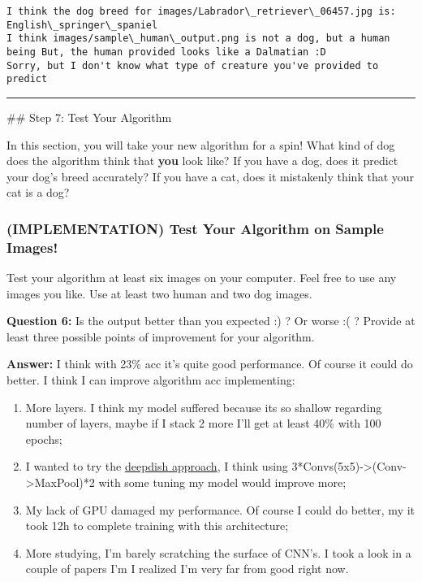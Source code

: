 \documentclass[11pt]{article}
\providecommand{\tightlist}{%
      \setlength{\itemsep}{0pt}\setlength{\parskip}{0pt}}
\begin{document}
    \begin{Verbatim}[commandchars=\\\{\}]
I think the dog breed for images/Labrador\_retriever\_06457.jpg is: English\_springer\_spaniel
I think images/sample\_human\_output.png is not a dog, but a human being But, the human provided looks like a Dalmatian :D
Sorry, but I don't know what type of creature you've provided to predict

    \end{Verbatim}

    \begin{center}\rule{0.5\linewidth}{\linethickness}\end{center}

 \#\# Step 7: Test Your Algorithm

In this section, you will take your new algorithm for a spin! What kind
of dog does the algorithm think that \textbf{you} look like? If you have
a dog, does it predict your dog's breed accurately? If you have a cat,
does it mistakenly think that your cat is a dog?

\hypertarget{implementation-test-your-algorithm-on-sample-images}{%
\subsubsection{(IMPLEMENTATION) Test Your Algorithm on Sample
Images!}\label{implementation-test-your-algorithm-on-sample-images}}

Test your algorithm at least six images on your computer. Feel free to
use any images you like. Use at least two human and two dog images.

\textbf{Question 6:} Is the output better than you expected :) ? Or
worse :( ? Provide at least three possible points of improvement for
your algorithm.

\textbf{Answer:} I think with 23\% acc it's quite good performance. Of
course it could do better. I think I can improve algorithm acc
implementing:

\begin{enumerate}
\def\labelenumi{\arabic{enumi}.}
\tightlist
\item
  More layers. I think my model suffered because its so shallow
  regarding number of layers, maybe if I stack 2 more I'll get at least
  40\% with 100 epochs;
\item
  I wanted to try the
  \href{https://github.com/abgoswam/deepdish}{deepdish approach}, I
  think using 3*Convs(5x5)-\textgreater{}(Conv-\textgreater{}MaxPool)*2
  with some tuning my model would improve more;
\item
  My lack of GPU damaged my performance. Of course I could do better, my
  it took 12h to complete training with this architecture;
\item
  More studying, I'm barely scratching the surface of CNN's. I took a
  look in a couple of papers I'm I realized I'm very far from good right
  now.
\end{enumerate}
\end{document}
